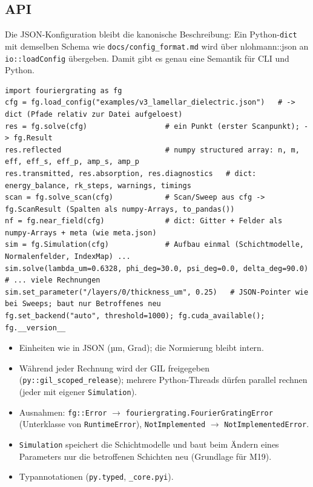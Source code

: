 \subsection{API}
Die JSON-Konfiguration bleibt die kanonische Beschreibung: Ein Python-\verb|dict| mit demselben Schema wie
\verb|docs/config_format.md| wird über nlohmann::json an \verb|io::loadConfig| übergeben. Damit gibt es genau
eine Semantik für CLI und Python.
{\footnotesize\begin{verbatim}
import fouriergrating as fg
cfg = fg.load_config("examples/v3_lamellar_dielectric.json")   # -> dict (Pfade relativ zur Datei aufgeloest)
res = fg.solve(cfg)                  # ein Punkt (erster Scanpunkt); -> fg.Result
res.reflected                        # numpy structured array: n, m, eff, eff_s, eff_p, amp_s, amp_p
res.transmitted, res.absorption, res.diagnostics   # dict: energy_balance, rk_steps, warnings, timings
scan = fg.solve_scan(cfg)            # Scan/Sweep aus cfg -> fg.ScanResult (Spalten als numpy-Arrays, to_pandas())
nf = fg.near_field(cfg)              # dict: Gitter + Felder als numpy-Arrays + meta (wie meta.json)
sim = fg.Simulation(cfg)             # Aufbau einmal (Schichtmodelle, Normalenfelder, IndexMap) ...
sim.solve(lambda_um=0.6328, phi_deg=30.0, psi_deg=0.0, delta_deg=90.0)   # ... viele Rechnungen
sim.set_parameter("/layers/0/thickness_um", 0.25)   # JSON-Pointer wie bei Sweeps; baut nur Betroffenes neu
fg.set_backend("auto", threshold=1000); fg.cuda_available(); fg.__version__
\end{verbatim}}
\begin{itemize}[nosep]
  \item Einheiten wie in JSON (µm, Grad); die Normierung bleibt intern.
  \item Während jeder Rechnung wird der GIL freigegeben (\verb|py::gil_scoped_release|); mehrere Python-Threads dürfen
        parallel rechnen (jeder mit eigener \verb|Simulation|).
  \item Ausnahmen: \verb|fg::Error| $\to$ \verb|fouriergrating.FourierGratingError| (Unterklasse von \verb|RuntimeError|),
        \verb|NotImplemented| $\to$ \verb|NotImplementedError|.
  \item \verb|Simulation| speichert die Schichtmodelle und baut beim Ändern eines Parameters nur die betroffenen
        Schichten neu (Grundlage für M19).
  \item Typannotationen (\verb|py.typed|, \verb|_core.pyi|).
\end{itemize}

